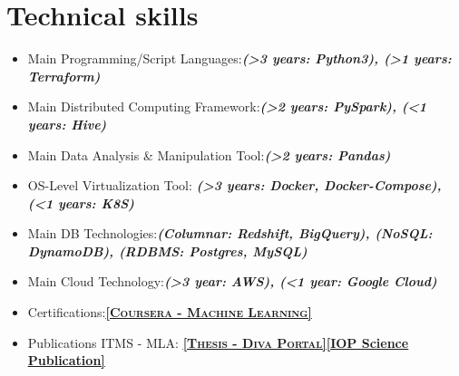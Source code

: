 \documentclass[11pt,a4paper,sans,colorlinks,linkcolor=blue,urlcolor=blue]{moderncv}
\begin{document}


\section{Technical skills}
\begin{itemize}
    \item Main Programming/Script Languages:\textbf{\textit{(>3 years: Python3), (>1 years: Terraform)}}
    \item Main Distributed Computing Framework:\textbf{\textit{(>2 years: PySpark), (<1 years: Hive)}}
    \item Main Data Analysis \& Manipulation Tool:\textbf{\textit{(>2 years: Pandas)}}
    \item OS-Level Virtualization Tool: \textbf{\textit{(>3 years: Docker, Docker-Compose), (<1 years: K8S)}}
    \item Main DB Technologies:\textbf{\textit{(Columnar: Redshift, BigQuery), (NoSQL: DynamoDB), (RDBMS: Postgres, MySQL)}}
    \item Main Cloud Technology:\textbf{\textit{(>3 year: AWS), (<1 year: Google Cloud)}}
    \item Certifications:\href{https://www.coursera.org/account/accomplishments/certificate/W5HM63ABYCDV}{\textbf{\textsc{\underline{[Coursera - Machine Learning]}}}}
    \item Publications ITMS - MLA\footnotemark[2]: \href{http://hh.diva-portal.org/smash/record.jsf?pid=diva2%3A1113511&dswid=4291#sthash.wwKv4JYI.dpbs}{\textbf{\textsc{\underline{[Thesis - Diva Portal]}}}}\href{http://iopscience.iop.org/article/10.1088/1757-899X/252/1/012018/pdf;jsessionid=EF9A9E415EC41D639019919DC566B21F.c4.iopscience.cld.iop.org}{\textbf{\underline{[IOP Science Publication]}}}
\end{itemize}
\end{document}
